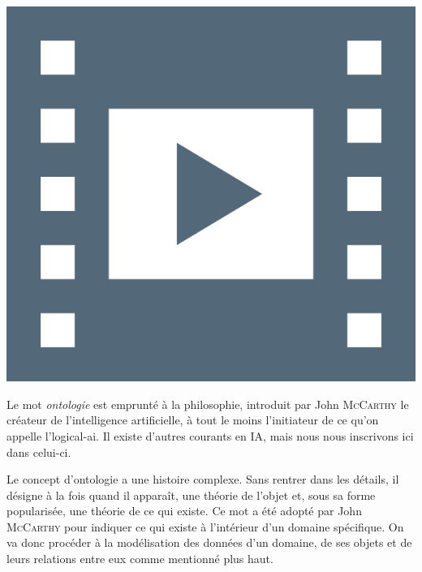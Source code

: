 \begin{marginvideo}
	\href{https://www.youtube.com/watch?v=sMXR1xUfLAo&list=PLWvGMqXvyJAMNWRvODUB5Ry3licACdaa0&index=16}%
		{\includegraphics[width=\marginparwidth]{./Images/Pictograms/film-strip-dark-electric-blue.png}}%
\end{marginvideo}

Le mot \emph{ontologie} est emprunté à la philosophie, introduit par John \textsc{McCarthy} le créateur de l'intelligence artificielle, à tout le moins l'initiateur de ce qu'on appelle l'\gls{logical-ai}. Il existe d'autres courants en IA, mais nous nous inscrivons ici dans celui-ci.

Le concept d'ontologie a une histoire complexe. Sans rentrer dans les détails, il désigne à la fois quand il apparaît, une théorie de l'objet et, sous sa forme popularisée, une théorie de ce qui existe. Ce mot a été adopté par John \textsc{McCarthy} pour indiquer ce qui existe à l'intérieur d'un domaine spécifique. On va donc procéder à la modélisation des données d'un domaine, de ses objets et de leurs relations entre eux comme mentionné plus haut.

